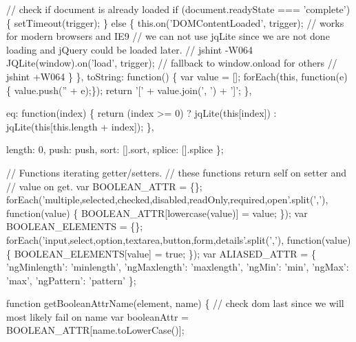 \begin{DoxyCodeInclude}
{    \textcolor{comment}{// check if document is already loaded}
    \textcolor{keywordflow}{if} (document.readyState === \textcolor{stringliteral}{'complete'}) \{
      setTimeout(trigger);
    \} \textcolor{keywordflow}{else} \{
      this.on(\textcolor{stringliteral}{'DOMContentLoaded'}, trigger); \textcolor{comment}{// works for modern browsers and IE9}
      \textcolor{comment}{// we can not use jqLite since we are not done loading and jQuery could be loaded later.}
      \textcolor{comment}{// jshint -W064}
      JQLite(window).on(\textcolor{stringliteral}{'load'}, trigger); \textcolor{comment}{// fallback to window.onload for others}
      \textcolor{comment}{// jshint +W064}
    \}
  \},
  toString: \textcolor{keyword}{function}() \{
    var value = [];
    forEach(\textcolor{keyword}{this}, \textcolor{keyword}{function}(e) \{ value.push(\textcolor{stringliteral}{''} + e);\});
    \textcolor{keywordflow}{return} \textcolor{charliteral}{'['} + value.join(\textcolor{stringliteral}{', '}) + \textcolor{charliteral}{']'};
  \},

  eq: \textcolor{keyword}{function}(index) \{
      \textcolor{keywordflow}{return} (index >= 0) ? jqLite(\textcolor{keyword}{this}[index]) : jqLite(\textcolor{keyword}{this}[this.length + index]);
  \},

  length: 0,
  push: push,
  sort: [].sort,
  splice: [].splice
\};

\textcolor{comment}{// Functions iterating getter/setters.}
\textcolor{comment}{// these functions return self on setter and}
\textcolor{comment}{// value on get.}
\textcolor{comment}{}var BOOLEAN\_ATTR = \{\};
forEach(\textcolor{stringliteral}{'multiple,selected,checked,disabled,readOnly,required,open'}.split(\textcolor{charliteral}{','}), \textcolor{keyword}{function}(value) \{
  BOOLEAN\_ATTR[lowercase(value)] = value;
\});
var BOOLEAN\_ELEMENTS = \{\};
forEach(\textcolor{stringliteral}{'input,select,option,textarea,button,form,details'}.split(\textcolor{charliteral}{','}), \textcolor{keyword}{function}(value) \{
  BOOLEAN\_ELEMENTS[value] = \textcolor{keyword}{true};
\});
var ALIASED\_ATTR = \{
  \textcolor{stringliteral}{'ngMinlength'}: \textcolor{stringliteral}{'minlength'},
  \textcolor{stringliteral}{'ngMaxlength'}: \textcolor{stringliteral}{'maxlength'},
  \textcolor{stringliteral}{'ngMin'}: \textcolor{stringliteral}{'min'},
  \textcolor{stringliteral}{'ngMax'}: \textcolor{stringliteral}{'max'},
  \textcolor{stringliteral}{'ngPattern'}: \textcolor{stringliteral}{'pattern'}
\};

\textcolor{keyword}{function} getBooleanAttrName(element, name) \{
  \textcolor{comment}{// check dom last since we will most likely fail on name}
  var booleanAttr = BOOLEAN\_ATTR[name.toLowerCase()];

}
\end{DoxyCodeInclude}
